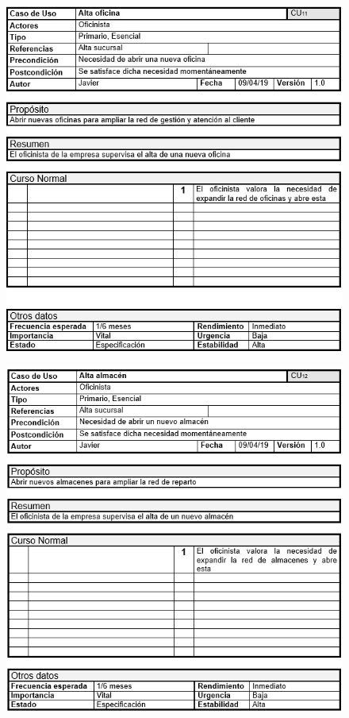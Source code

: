 \begin{figure}[H]
	\centering
	\includegraphics[width=16cm]{11j}
\end{figure}
\begin{figure}[H]
	\centering
	\includegraphics[width=16cm]{12j}
\end{figure}
